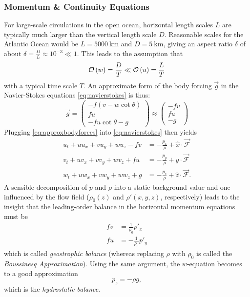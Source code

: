 \subsubsection{Momentum \& Continuity Equations}
For large-scale circulations in the open ocean, horizontal length scales \(L\) are typically much larger than the vertical length scale \(D\). Reasonable scales for the Atlantic Ocean would be \(L = \SI{5000}{\kilo\metre}\) and \(D = \SI{5}{\kilo\metre}\), giving an aspect ratio \(\delta\) of about \(\delta = \frac{D}{L} \approx 10^{-3} \ll 1\).  This leads to the assumption that 
%
\begin{equation}
\mathcal{O}\left(w\right) = \frac{D}{T} \ll \mathcal{O}\left(u\right) = \frac{L}{T} \label{eq:wsmall}
\end{equation}
%
with a typical time scale \(T\). An approximate form of the body forcing \(\vec{g}\) in the Navier-Stokes equations \eqref{eq:navierstokes} is thus:
%
\begin{equation}
\vec{g} = \begin{pmatrix} - f(v - w \cot\theta) \\ fu \\ -fu\cot\theta - g \end{pmatrix} \approx \begin{pmatrix} -fv \\ fu \\ -g \end{pmatrix} \label{eq:approxbodyforces}
\end{equation}
%
Plugging \eqref{eq:approxbodyforces} into \eqref{eq:navierstokes} then yields
%
\begin{align}
u_t + u u_x + v u_y + w u_z - fv &= -\frac{p_x}{\rho} + \hat{x} \cdot \vec{\mathcal{F}} \nonumber \\
v_t + u v_x + v v_y + w v_z + fu &= -\frac{p_y}{\rho} + \hat{y} \cdot \vec{\mathcal{F}}
\label{eq:approxmomentum}\\
w_t + u w_x + v w_y + w w_z + g &= -\frac{p_z}{\rho} + \hat{z} \cdot \vec{\mathcal{F}}. \nonumber
\end{align}
%
A sensible decomposition of \(p\) and \(\rho\) into a static background value and one influenced by the flow field (\(\rho_0(z)\) and \(\rho'(x,y,z)\), respectively) leads to the insight that the leading-order balance in the horizontal momentum equations must be
%
\begin{align}
fv &= \frac{1}{\rho_0} p'_x \\
fu &= -\frac{1}{\rho_0} p'_y \label{eq:geostrophy}
\end{align}
%
which is called \emph{geostrophic balance} (whereas replacing \(\rho\) with \(\rho_0\) is called the \emph{Boussinesq Approximation}). Using the same argument, the \(w\)-equation becomes to a good approximation
%
\begin{equation}
p_z = -\rho g, \label{eq:hydrostatic}
\end{equation}
%
which is the \emph{hydrostatic balance}.

